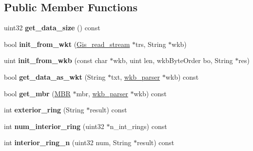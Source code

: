 \subsection*{Public Member Functions}
\begin{DoxyCompactItemize}
\item 
\mbox{\label{classGis__polygon_a04f83aefe7743f9f55c45c5d3bfe5dcc}} 
uint32 {\bfseries get\+\_\+data\+\_\+size} () const
\item 
\mbox{\label{classGis__polygon_a1469876ed801b26c1d701d7a977e5795}} 
bool {\bfseries init\+\_\+from\+\_\+wkt} (\mbox{\hyperlink{classGis__read__stream}{Gis\+\_\+read\+\_\+stream}} $\ast$trs, String $\ast$wkb)
\item 
\mbox{\label{classGis__polygon_a953cbccc022a7677826ff4e710dbf296}} 
uint {\bfseries init\+\_\+from\+\_\+wkb} (const char $\ast$wkb, uint len, wkb\+Byte\+Order bo, String $\ast$res)
\item 
\mbox{\label{classGis__polygon_a0c0ce8609552b3aaab9a367c9b98319d}} 
bool {\bfseries get\+\_\+data\+\_\+as\+\_\+wkt} (String $\ast$txt, \mbox{\hyperlink{classGeometry_1_1wkb__parser}{wkb\+\_\+parser}} $\ast$wkb) const
\item 
\mbox{\label{classGis__polygon_a463d2153208810279f44a588e0a05f4b}} 
bool {\bfseries get\+\_\+mbr} (\mbox{\hyperlink{structMBR}{M\+BR}} $\ast$mbr, \mbox{\hyperlink{classGeometry_1_1wkb__parser}{wkb\+\_\+parser}} $\ast$wkb) const
\item 
\mbox{\label{classGis__polygon_ad665298724a2ec91d3890d2a6f456017}} 
int {\bfseries exterior\+\_\+ring} (String $\ast$result) const
\item 
\mbox{\label{classGis__polygon_a89e6432cbd6596686a8dd29459b96acf}} 
int {\bfseries num\+\_\+interior\+\_\+ring} (uint32 $\ast$n\+\_\+int\+\_\+rings) const
\item 
\mbox{\label{classGis__polygon_aff4007e82c05d92ea513e026b7097216}} 
int {\bfseries interior\+\_\+ring\+\_\+n} (uint32 num, String $\ast$result) const
\item 
\mbox{\label{classGis__polygon_aabc3f7a3c48d75b90de5de64f38f7e26}} 

\end{DoxyCompactItemize}

